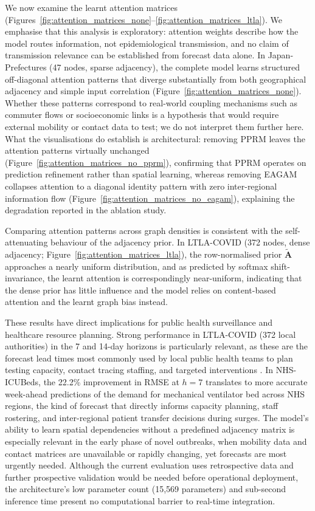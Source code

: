 \documentclass[final,1p,times]{elsarticle}
\begin{document}
We now examine the learnt attention matrices (Figures~\ref{fig:attention_matrices_none}--\ref{fig:attention_matrices_ltla}). We emphasise that this analysis is exploratory: attention weights describe how the model routes information, not epidemiological transmission, and no claim of transmission relevance can be established from forecast data alone. In Japan-Prefectures (47 nodes, sparse adjacency), the complete model learns structured off-diagonal attention patterns that diverge substantially from both geographical adjacency and simple input correlation (Figure~\ref{fig:attention_matrices_none}). Whether these patterns correspond to real-world coupling mechanisms such as commuter flows or socioeconomic links is a hypothesis that would require external mobility or contact data to test; we do not interpret them further here. What the visualisations do establish is architectural: removing PPRM leaves the attention patterns virtually unchanged (Figure~\ref{fig:attention_matrices_no_pprm}), confirming that PPRM operates on prediction refinement rather than spatial learning, whereas removing EAGAM collapses attention to a diagonal identity pattern with zero inter-regional information flow (Figure~\ref{fig:attention_matrices_no_eagam}), explaining the degradation reported in the ablation study.

Comparing attention patterns across graph densities is consistent with the self-attenuating behaviour of the adjacency prior. In LTLA-COVID (372 nodes, dense adjacency; Figure~\ref{fig:attention_matrices_ltla}), the row-normalised prior $\tilde{\mathbf{A}}$ approaches a nearly uniform distribution, and as predicted by softmax shift-invariance, the learnt attention is correspondingly near-uniform, indicating that the dense prior has little influence and the model relies on content-based attention and the learnt graph bias instead.

These results have direct implications for public health surveillance and healthcare resource planning. Strong performance in LTLA-COVID (372 local authorities) in the 7 and 14-day horizons is particularly relevant, as these are the forecast lead times most commonly used by local public health teams to plan testing capacity, contact tracing staffing, and targeted interventions \cite{Brooks2018Nonmechanistic}. In NHS-ICUBeds, the 22.2\% improvement in RMSE at $h{=}7$ translates to more accurate week-ahead predictions of the demand for mechanical ventilator bed across NHS regions, the kind of forecast that directly informs capacity planning, staff rostering, and inter-regional patient transfer decisions during surges. The model's ability to learn spatial dependencies without a predefined adjacency matrix is especially relevant in the early phase of novel outbreaks, when mobility data and contact matrices are unavailable or rapidly changing, yet forecasts are most urgently needed. Although the current evaluation uses retrospective data and further prospective validation would be needed before operational deployment, the architecture's low parameter count (15,569 parameters) and sub-second inference time present no computational barrier to real-time integration.
\end{document}
